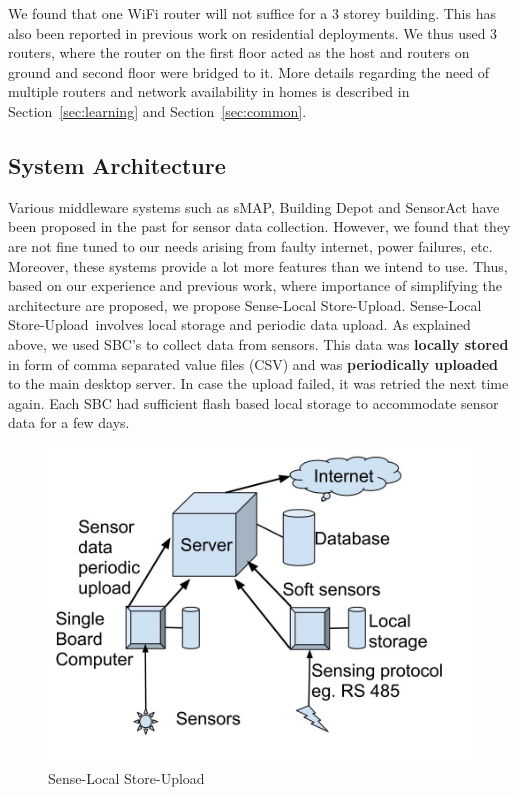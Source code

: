 \documentclass[10pt]{sensys-proc}
\newcommand{\secref}[1]{Section~\ref{#1}}
\newcommand{\paradigm}{Sense-Local Store-Upload}
\newcommand{\paradigms}{Sense-Local Store-Upload~}
\begin{document}
We found that one WiFi router will not suffice for a 3 storey building. This has also been reported in previous work on residential deployments\cite{hitchhiker_residential}. We thus used 3 routers, where the router on the first floor acted as the host and routers on ground and second floor were bridged to it. More details regarding the need of multiple routers and network availability in homes is described in \secref{sec:learning} and \secref{sec:common}.




\subsection{System Architecture}	
\label{sec:architecture}
Various middleware systems such as sMAP\cite{smap}, Building Depot\cite{buildingdepot} and SensorAct\cite{Arjunan12} have been proposed in the past for sensor data collection. However, we found that they are not fine tuned to our needs arising from faulty internet, power failures, etc. Moreover, these systems provide a lot more features than we intend to use. Thus, based on our experience and previous work\cite{hitchhiker_residential}, where importance of simplifying the architecture are proposed, we propose \paradigm. \paradigms involves local storage and periodic data upload. As explained above, we used SBC's to collect data from sensors. This data was \textbf{locally stored} in form of comma separated value files (CSV) and was \textbf{periodically uploaded} to the main desktop server. In case the upload failed, it was retried the next time again. Each SBC had sufficient flash based local storage to accommodate sensor data for a few days. 

\begin{figure}     
    \includegraphics[scale=0.20]{./figures/architecture.jpg}    
    \caption{\paradigm}   
    \label{fig:architecture}   
\end{figure}
\end{document}
